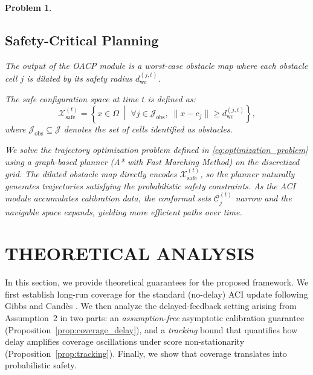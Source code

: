 \documentclass[letterpaper, 10 pt, conference]{ieeeconf}  %
\newtheorem{myprob}{\bf Problem}
\begin{document}
\begin{myprob}
\subsection{Safety-Critical Planning}
\label{subsec:planning}

The output of the OACP module is a worst-case obstacle map where each obstacle cell $j$ is dilated by its safety radius $d_{\text{wc}}^{(j, t)}$.

The safe configuration space at time $t$ is defined as:
\begin{equation}
    \mathcal{X}_{\text{safe}}^{(t)} = \left\{ x \in \Omega \;\middle|\; \forall j \in \mathcal{J}_{\text{obs}},\; \| x - c_j \| \ge d_{\text{wc}}^{(j, t)} \right\},
\end{equation}
where $\mathcal{J}_{\text{obs}} \subseteq \mathcal{J}$ denotes the set of cells identified as obstacles.

We solve the trajectory optimization problem defined in \eqref{eq:optimization_problem} using a graph-based planner (A* with Fast Marching Method) on the discretized grid. The dilated obstacle map directly encodes $\mathcal{X}_{\text{safe}}^{(t)}$, so the planner naturally generates trajectories satisfying the probabilistic safety constraints. As the ACI module accumulates calibration data, the conformal sets $\mathcal{C}_j^{(t)}$ narrow and the navigable space expands, yielding more efficient paths over time.

\end{myprob}\medskip



\section{THEORETICAL ANALYSIS}
\label{sec:analysis}

In this section, we provide theoretical guarantees for the proposed framework. We first establish long-run coverage for the standard (no-delay) ACI update following Gibbs and Cand\`es \cite{gibbs2021adaptive}. We then analyze the delayed-feedback setting arising from Assumption~2 in two parts: an \emph{assumption-free} asymptotic calibration guarantee (Proposition~\ref{prop:coverage_delay}), and a \emph{tracking} bound that quantifies how delay amplifies coverage oscillations under score non-stationarity (Proposition~\ref{prop:tracking}). Finally, we show that coverage translates into probabilistic safety.
\end{document}

